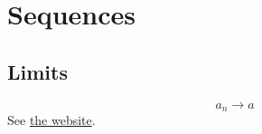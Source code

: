 \documentclass[14pt,letterpaper,oneside]{memoir}
\begin{document}
\chapter{Sequences}
\section*{Limits}
\begin{equation} a_n \to a \end{equation}
See \href{https://aaronlin1229.github.io/}{the website}.
\end{document}
